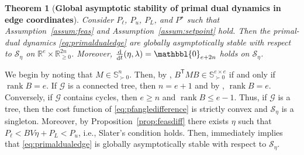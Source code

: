 \documentclass[twocolumn,twoside,journal]{IEEEtran}
\DeclareMathOperator{\rank}{rank}
\DeclareMathOperator{\diff}{d}
\newcommand{\mc}{\mathcal}
\newcommand{\ddt}{\tfrac{\diff}{\diff \!t}}
\newtheorem{theorem}{Theorem}
\begin{document}
\begin{theorem}[\textbf{Global asymptotic stability of primal dual dynamics in edge coordinates}]\label{thm:edgeconvergence}
    Consider $P_\ell$, $P_u$, $P_L$, and $P^\star$ such that Assumption~\ref{assum:feas} and Assumption~\ref{assum:setpoint} hold. Then the primal-dual dynamics \eqref{eq:primaldualedge} are globally asymptotically stable with respect to $\mc S_\eta$ on $\mathbb{R}^{e} \times \mathbb{R}^{2n}_{\geq0}$. Moreover, $\ddt (\eta,\lambda) = \mathbbl{0}_{e+2n}$ holds on $\mc S_\eta$. 
\end{theorem}
\begin{IEEEproof} We begin by noting that $M \in \mathbb{S}^n_{\succ 0}$. Then, by \cite[Observation~7.1.8]{HJ2013}, $B^\mathsf{T} M B \in \mathbb{S}^{e \times e}_{\succ 0}$ if and only if $\rank{B}=e$. If $\mc G$ is a connected tree, then $n=e+1$ and by \cite[Lemma 9.2]{LNS}, $\rank{B}=e$. Conversely, if $\mc G$ contains cycles, then $e \geq n$ and $\rank{B} \leq e-1$. Thus, if $\mc G$ is a tree, then the cost function of \eqref{eq:pfangledifference} is strictly convex and $\mc S_\eta$ is a singleton. Moreover, by Proposition~\ref{prop:feasdiff} there exists $\eta$ such that $P_\ell < B V \eta + P_L < P_u$, i.e., Slater's condition holds. Then, \cite[Theorem~4.5]{ashish} immediately implies that \eqref{eq:primaldualedge} is globally asymptotically stable with respect to $\mc S_\eta$. 
        

\end{IEEEproof}
\end{document}
